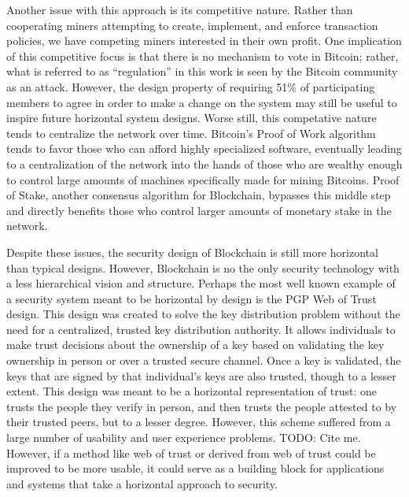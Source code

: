 Another issue with this approach is its competitive nature. Rather than
cooperating miners attempting to create, implement, and enforce transaction
policies, we have competing miners interested in their own profit. One
implication of this competitive focus is that there is no mechanism to vote in
Bitcoin; rather, what is referred to as ``regulation'' in this work is seen by
the Bitcoin community as an attack. However, the design property of requiring
51\% of participating members to agree in order to make a change on the system
may still be useful to inspire future horizontal system designs. Worse still,
this competative nature tends to centralize the network over time. Bitcoin's
Proof of Work algorithm tends to favor those who can afford highly specialized
software, eventually leading to a centralization of the network into the hands
of those who are wealthy enough to control large amounts of machines
specifically made for mining Bitcoins. Proof of Stake, another consensus
algorithm for Blockchain, bypasses this middle step and directly benefits those
who control larger amounts of monetary stake in the network.


Despite these issues, the security design of Blockchain is still more horizontal
than typical designs. However, Blockchain is no the only security technology
with a less hierarchical vision and structure. Perhaps the most well known
example of a security system meant to be horizontal by design is the PGP Web of
Trust design. This design was created to solve the key distribution problem
without the need for a centralized, trusted key distribution authority. It
allows individuals to make trust decisions about the ownership of a key based on
validating the key ownership in person or over a trusted secure channel. Once a
key is validated, the keys that are signed by that individual's keys are also
trusted, though to a lesser extent. This design was meant to be a horizontal
representation of trust: one trusts the people they verify in person, and then
trusts the people attested to by their trusted peers, but to a lesser degree.
However, this scheme suffered from a large number of usability and user
experience problems. {\color{red} TODO: Cite me.} However, if a method like web
of trust or derived from web of trust could be improved to be more usable, it
could serve as a building block for applications and systems that take a
horizontal approach to security.

